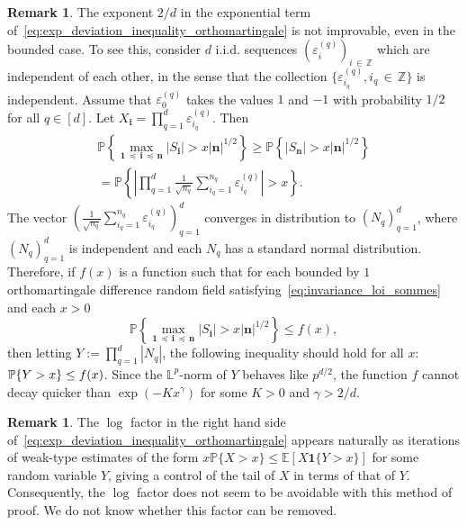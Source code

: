 \documentclass[10pt]{amsart}
\theoremstyle{definition}\newtheorem{defi}[theo]{Definition}\newtheorem{rema}[theo]{Remark}\newtheorem{exam}[theo]{Example}\newtheorem{exem}[theo]{Example}\newtheorem{nota}[theo]{Notation}
\newcommand{\bfun}{\mathbf{1}}
\newcommand\PP{\mathbb{P}}
\newcommand\Z{\mathbb{Z}}
\newcommand{\bbL}{\mathbb{L}}
\newcommand{\E}[1]{\mathbb E[#1]}
\newcommand\ens[1]{\{ #1\}}
\newcommand\abs[1]{|#1|}
\newcommand{\pr}[1]{(#1)}
\newcommand\eps{\varepsilon}
\newcommand{\gr}[1]{\bm{#1}}
\newcommand{\gri}{\bm{i}}
\newcommand{\grn}{\bm{n}}
\newcommand{\imd}{\preccurlyeq}
\begin{document}
\begin{rema}
The exponent $2/d$ in the exponential term of~\eqref{eq:exp_deviation_inequality_orthomartingale} is not improvable, even in the bounded case. To see this, consider $d$ i.i.d. sequences $\pr{\eps_i^{\pr{q}}}_{i\,\in\,\Z}$ which are independent of each other, in the sense that the collection $\ens{\eps_{i_q}^{\pr{q}}, i_q\,\in\,\Z}$ is independent. Assume that $\eps_0^{\pr{q}}$ takes the values $1$ and $-1$ with probability $1/2$ for all $q\in [d]$. Let $X_{\gri}=\prod_{q=1}^d\eps_{i_q}^{\pr{q}}$. Then
\begin{multline}
\PP\left\{\max_{\gr{1}\,\imd\,\gri\,\imd\,\gr{n} } \left|S_{\gri} \right| >x\left|\grn\right|^{1/2}\right\}\geq
\PP\left\{ \left|S_{\grn} \right| >x\left|\grn\right|^{1/2}\right\}\\
=
\PP\left\{ \left|\prod_{q=1}^d
\frac 1{\sqrt{n_q}}\sum_{i_q=1}^{n_q}\eps_{i_q}^{\pr{q}} \right| >x \right\}.
\end{multline}
The vector $\pr{\frac 1{\sqrt{n_q}}\sum_{i_q=1}^{n_q}\eps_{i_q}^{\pr{q}}}_{q=1}^d$ converges in distribution to $\pr{N_q}_{q=1}^d$, where $\pr{N_q}_{q=1}^d$ is independent and each $N_q$ has a standard normal distribution. Therefore, if $f\pr{x}$ is a function such that for each bounded by $1$ orthomartingale difference random field satisfying~\eqref{eq:invariance_loi_sommes} and each $x>0$
\begin{equation}
\PP\left\{\max_{\gr{1}\,\imd\,\gri\,\imd\,\gr{n}} \left|S_{\gri} \right| >x\left|\grn\right|^{1/2}\right\}\leq f\pr{x},
\end{equation}
then letting $Y:= \prod_{q=1}^d\abs{N_q}$, the following inequality should hold for all $x$: $\PP\ens{Y>x}\linebreak\leq f\pr{x}$. Since the $\bbL^p$-norm of $Y$ behaves like $p^{d/2}$, the function $f$ cannot decay quicker than $\exp\pr{-Kx^{\gamma}}$ for some $K>0$ and $\gamma>2/d$.
\end{rema}

\begin{rema}
The $\log$ factor in the right hand side of~\eqref{eq:exp_deviation_inequality_orthomartingale} appears naturally as iterations of weak-type estimates of the form $x\PP\ens{X>x}\leq \E{X\bfun\ens{Y>x}}$ for some random variable $Y$, giving a control of the tail of $X$ in terms of that of $Y$. Consequently, the $\log$ factor does not seem to be avoidable with this method of proof. We do not know whether this factor can be removed.
\end{rema}
\end{document}
